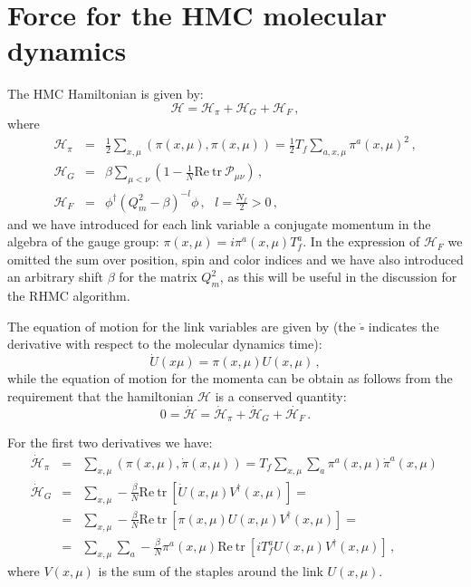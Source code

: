\documentclass{article}[12pt]
\begin{document}
\section{Force for the HMC molecular dynamics} \label{SHMC}
The HMC Hamiltonian is given by:
\begin{equation}
\mathcal{H}=\mathcal{H}_\pi+\mathcal{H}_G+\mathcal{H}_F \, ,
\end{equation}
where
\begin{eqnarray}
\mathcal{H}_\pi &=& \frac{1}{2} \sum_{x,\mu} ( \pi(x,\mu) , \pi(x,\mu) ) = \frac{1}{2} T_f \sum_{a,x,\mu} \pi^a(x,\mu)^2 \, ,\\
\mathcal{H}_G &=& \beta \sum_{\mu<\nu} \left( 1- \frac{1}{N} \mathrm{Re\ tr\ } \mathcal{P}_{\mu\nu}\right) \, ,\\
\mathcal{H}_F &=& \phi^\dagger ( Q_m^2 - \beta )^{-l} \phi \, , \,\,\,\, l=\frac{N_f}{2}>0 \, , \label{HF}
\end{eqnarray}
and we have introduced for each link variable a conjugate momentum in the algebra of the gauge group: $\pi(x,\mu)=i \pi^a(x,\mu) T_f^a$.
In the expression of $\mathcal{H}_F$ we omitted the sum over position, spin and color indices and we have also introduced an arbitrary shift $\beta$ for the matrix $Q_m^2$, as this will be useful in the discussion
for the RHMC algorithm.

The equation of motion for the link variables are given by (the $\dot{\square}$ indicates the derivative with respect to the molecular dynamics time):
\begin{equation}
\dot U(x\mu) = \pi(x,\mu) U(x,\mu)\, ,
\end{equation}
while the equation of motion for the momenta can be obtain as follows from the requirement that the hamiltonian
$\mathcal{H}$ is a conserved quantity:
\begin{equation}
0 = \dot{\mathcal{H}} = \dot{\mathcal{H}}_\pi + \dot{\mathcal{H}}_G + \dot{\mathcal{H}_F} \, . \label{HCONS}
\end{equation}

For the first two derivatives we have:
\begin{eqnarray}
\dot{\mathcal{H}}_\pi &=& \sum_{x,\mu} ( \pi(x,\mu) , \dot\pi(x,\mu) ) = T_f \sum_{x,\mu} \sum_a \pi^a(x,\mu) \dot\pi^a(x,\mu) \, \label{HDOTPI}\\
		\dot{\mathcal{H}}_G &=& \sum_{x,\mu} -\frac{\beta}{N} \mathrm{Re\ tr\ } \left[ \dot U(x,\mu) V^\dagger(x,\mu) \right] = \nonumber \\
	&=& \sum_{x,\mu} -\frac{\beta}{N} \mathrm{Re\ tr\ } \left[ \pi(x,\mu) U(x,\mu) V^\dagger(x,\mu) \right] \nonumber = \\
	&=& \sum_{x,\mu} \sum_a -\frac{\beta}{N} \pi^a(x,\mu) \mathrm{Re\ tr\ } \left[ i T^a_f U(x,\mu) V^\dagger(x,\mu) \right] \, , \label{HDOTG}
\end{eqnarray}
where $V(x,\mu)$ is the sum of the staples around the link $U(x,\mu)$.
\end{document}
